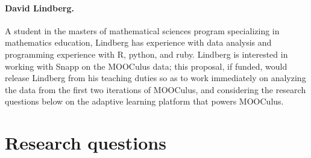 \documentclass[12pt]{article}
\begin{document}
\paragraph*{David Lindberg.} A student in the masters of mathematical
sciences program specializing in mathematics education, Lindberg has
experience with data analysis and programming experience with R,
python, and ruby.  Lindberg is interested in working with Snapp on the
MOOCulus data; this proposal, if funded, would release Lindberg from
his teaching duties so as to work immediately on analyzing the data
from the first two iterations of MOOCulus, and considering the
research questions below on the adaptive learning platform that powers
MOOCulus.

\section{Research questions}
\end{document}
